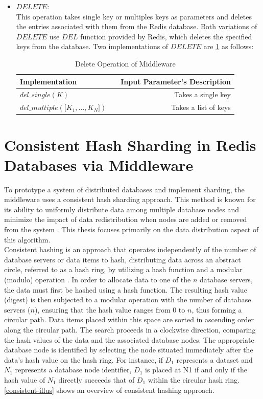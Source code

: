 \begin{itemize}
\item[-] $DELETE:$ \\
This operation takes single key or multiples keys as parameters and deletes the entries associated with them from the Redis database. Both variations of $DELETE$ use $DEL$ function provided by Redis, which deletes the specified keys from the database. 
Two implementations of $DELETE$ are \cref{del_op} as follows:
\begin{table} [H]
\centering
\begin{tabular}{@{} lcr @{}} %
	\toprule
	Implementation && Input Parameter’s Description	\\
	\midrule
	$del\_single (K)$	&&	Takes a single key  \\
	$del\_multiple(\bigl[K_{1}, ... , K_{N}\bigr])$	&&	Takes a list of keys\\
	\bottomrule
\end{tabular}
\caption[]{Delete Operation of Middleware}
\label{del_op}
\end{table}

\end{itemize}
\section{Consistent Hash Sharding in Redis Databases via Middleware} \label{4.4}
To prototype a system of distributed databases and implement sharding, the middleware uses a consistent hash sharding approach. This method is known for its ability to uniformly distribute data among multiple database nodes and minimize the impact of data redistribution when nodes are added or removed from the system \cite{9004233, karger1997consistent}. This thesis focuses primarily on the data distribution aspect of this algorithm. \\

\noindent Consistent hashing is an approach that operates independently of the number of database servers or data items to hash, distributing data across an abstract circle, referred to as a hash ring, by utilizing a hash function and a modular (modulo) operation  \cite{karger1997consistent}. In order to allocate data to one of the $n$ database servers, the data must first be hashed using a hash function. The resulting hash value (digest) is then subjected to a modular operation with the number of database servers ($n$), ensuring that the hash value ranges from 0 to $n$, thus forming a circular path. Data items placed within this space are sorted in ascending order along the circular path. The search proceeds in a clockwise direction, comparing the hash values of the data and the associated database nodes. The appropriate database node is identified by selecting the node situated immediately after the data's hash value on the hash ring. For instance, if $D_{1}$ represents a dataset and $N_{1}$ represents a database node identifier, $D_{1}$ is placed at N1 if and only if the hash value of $N_{1}$ directly succeeds that of $D_{1}$ within the circular hash ring. \cref{consistent-illus} shows an overview of consistent hashing approach. \\

